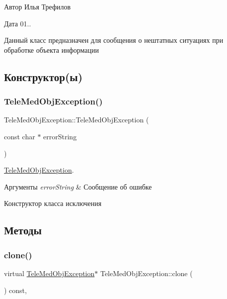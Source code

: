 \begin{DoxyAuthor}{Автор}
Илья Трефилов 
\end{DoxyAuthor}
\begin{DoxyDate}{Дата}
01..
\end{DoxyDate}
Данный класс предназначен для сообщения о нештатных ситуациях при обработке объекта информации 

\subsection{Конструктор(ы)}
\mbox{\label{classTeleMedObjException_a351ba22504a9acf7ed560fd6659013da}} 
\subsubsection{\texorpdfstring{Tele\+Med\+Obj\+Exception()}{TeleMedObjException()}}
{\footnotesize\ttfamily Tele\+Med\+Obj\+Exception\+::\+Tele\+Med\+Obj\+Exception (\begin{DoxyParamCaption}\item[{const char $\ast$}]{error\+String }\end{DoxyParamCaption})\hspace{0.3cm}{\ttfamily [inline]}}



\hyperlink{classTeleMedObjException}{Tele\+Med\+Obj\+Exception}. 


\begin{DoxyParams}{Аргументы}
{\em error\+String} & Сообщение об ошибке\\
\hline
\end{DoxyParams}
Конструктор класса исключения 

\subsection{Методы}
\mbox{\label{classTeleMedObjException_a32f7656b034f2a49c7622def17ff8b63}} 
\subsubsection{\texorpdfstring{clone()}{clone()}}
{\footnotesize\ttfamily virtual \hyperlink{classTeleMedObjException}{Tele\+Med\+Obj\+Exception}$\ast$ Tele\+Med\+Obj\+Exception\+::clone (\begin{DoxyParamCaption}{ }\end{DoxyParamCaption}) const\hspace{0.3cm}{\ttfamily [inline]}, {\ttfamily [virtual]}}



